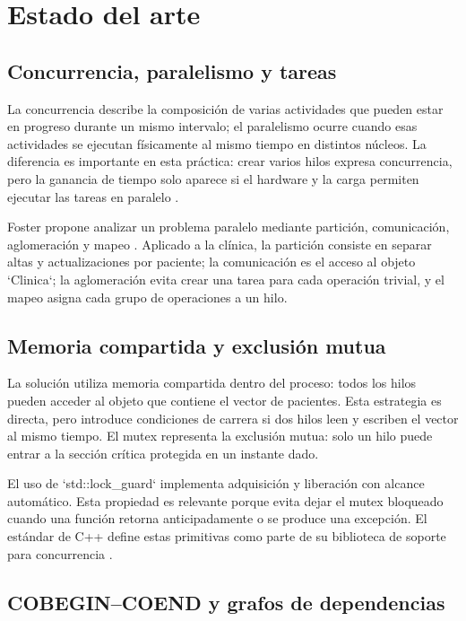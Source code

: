 \documentclass[12pt,letterpaper]{article}
\begin{document}
\section{Estado del arte}

\subsection{Concurrencia, paralelismo y tareas}

La concurrencia describe la composición de varias actividades que pueden estar
en progreso durante un mismo intervalo; el paralelismo ocurre cuando esas
actividades se ejecutan físicamente al mismo tiempo en distintos núcleos. La
diferencia es importante en esta práctica: crear varios hilos expresa
concurrencia, pero la ganancia de tiempo solo aparece si el hardware y la carga
permiten ejecutar las tareas en paralelo \cite{andrewsmultithreaded,herlihy2020}.

Foster propone analizar un problema paralelo mediante partición, comunicación,
aglomeración y mapeo \cite{foster1995}. Aplicado a la clínica, la partición
consiste en separar altas y actualizaciones por paciente; la comunicación es el
acceso al objeto `Clinica`; la aglomeración evita crear una tarea para cada
operación trivial, y el mapeo asigna cada grupo de operaciones a un hilo.

\subsection{Memoria compartida y exclusión mutua}

La solución utiliza memoria compartida dentro del proceso: todos los hilos
pueden acceder al objeto que contiene el vector de pacientes. Esta estrategia
es directa, pero introduce condiciones de carrera si dos hilos leen y escriben
el vector al mismo tiempo. El mutex representa la exclusión mutua: solo un hilo
puede entrar a la sección crítica protegida en un instante dado.

El uso de `std::lock\_guard` implementa adquisición y liberación con alcance
automático. Esta propiedad es relevante porque evita dejar el mutex bloqueado
cuando una función retorna anticipadamente o se produce una excepción. El
estándar de C++ define estas primitivas como parte de su biblioteca de soporte
para concurrencia \cite{iso14882,cppreferenceconcurrency}.

\subsection{COBEGIN--COEND y grafos de dependencias}
\end{document}
